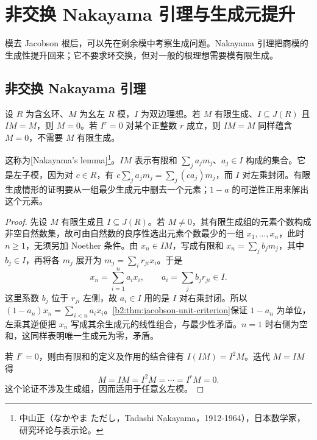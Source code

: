 
\section{非交换 Nakayama 引理与生成元提升}
\label{b2:sec:1402}

模去 Jacobson 根后，可以先在剩余模中考察生成问题。Nakayama 引理把商模的生成性提升回来；它不要求环交换，但对一般的根理想需要模有限生成。

%
%

\subsection{非交换 Nakayama 引理}
\label{b2:subsec:1402:01}

\begin{theorem}\label{b2:thm:noncommutative-nakayama}
	设 \(R\) 为含幺环、\(M\) 为幺左 \(R\) 模，\(I\) 为双边理想。若 \(M\) 有限生成、\(I\subseteq J(R)\) 且 \(IM=M\)，则 \(M=0\)。若 \(I^r=0\) 对某个正整数 \(r\) 成立，则 \(IM=M\) 同样蕴含 \(M=0\)，不需要 \(M\) 有限生成。
\end{theorem}

这称为[Nakayama's lemma]\footnote{中山正（なかやま ただし，Tadashi Nakayama，1912-1964），日本数学家，研究环论与表示论。}。\(IM\) 表示有限和 \(\sum_j a_jm_j\)、\(a_j\in I\) 构成的集合。它是左子模，因为对 \(c\in R\)，有 \(c\sum_j a_jm_j=\sum_j(ca_j)m_j\)，而 \(I\) 对左乘封闭。有限生成情形的证明要从一组最少生成元中删去一个元素；\(1-a\) 的可逆性正用来解出这个元素。

\begin{proof}
	先设 \(M\) 有限生成且 \(I\subseteq J(R)\)。若 \(M\ne0\)，其有限生成组的元素个数构成非空自然数集，故可由自然数的良序性选出元素个数最少的一组 \(x_1,\ldots,x_n\)，此时 \(n\ge1\)，无须另加 Noether 条件。由 \(x_n\in IM\)，写成有限和 \(x_n=\sum_jb_jm_j\)，其中 \(b_j\in I\)，再将各 \(m_j\) 展开为 \(m_j=\sum_i r_{ji}x_i\)。于是
	\[
		x_n=\sum_{i=1}^n a_i x_i,\qquad a_i=\sum_j b_jr_{ji}\in I.
	\]
	这里系数 \(b_j\) 位于 \(r_{ji}\) 左侧，故 \(a_i\in I\) 用的是 \(I\) 对右乘封闭。所以 \((1-a_n)x_n=\sum_{i<n}a_ix_i\)。\cref{b2:thm:jacobson-unit-criterion}保证 \(1-a_n\) 为单位，左乘其逆便把 \(x_n\) 写成其余生成元的线性组合，与最少性矛盾。\(n=1\) 时右侧为空和，这同样表明唯一生成元为零，矛盾。

	若 \(I^r=0\)，则由有限和的定义及作用的结合律有 \(I(IM)=I^2M\)。迭代 \(M=IM\) 得
	\[
		M=IM=I^2M=\cdots=I^rM=0.
	\]
	这个论证不涉及生成组，因而适用于任意幺左模。
\end{proof}

